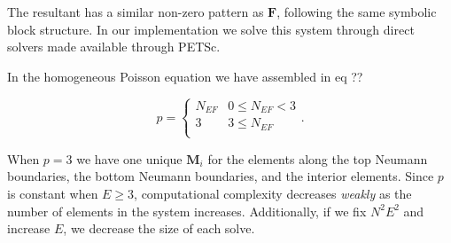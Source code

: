 \noindent
The resultant has a similar non-zero pattern as $\textbf{F}$, following the same symbolic block structure. In our implementation we solve this system through direct solvers made available through PETSc. 

\begin{aside}
	In the homogeneous Poisson equation we have assembled in 
	eq {\color{red} ?? } 

	\begin{equation}
		p = \begin{cases}
		    N_{EF} &  0 \leq N_{EF} < 3 \\ 
			3 &  3 \leq N_{EF} \\ 
		\end{cases}.
	\end{equation} 

	\noindent 
	When $p = 3$ we have one unique $\textbf{M}_i$ for the elements 
	along the top Neumann boundaries, the bottom Neumann boundaries, 
	and the interior elements. Since $p$ is constant when 
	$E \geq 3$, computational complexity decreases \emph{weakly} 
	as the number of elements in the system increases. Additionally, 
	if we fix $N^2E^2$ and increase $E$, we decrease the size of 
	each solve.
\end{aside}

